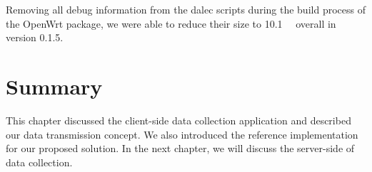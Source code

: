     Removing all debug information from the dalec scripts during the build process of the OpenWrt package, we were able to reduce their size to \SIlist{10.1}{\kilo\byte} overall in version 0.1.5.
    

    
\section{Summary}

This chapter discussed the client-side data collection application and described our data transmission concept. We also introduced the reference implementation for our proposed solution. In the next chapter, we will discuss the server-side of data collection.
%
